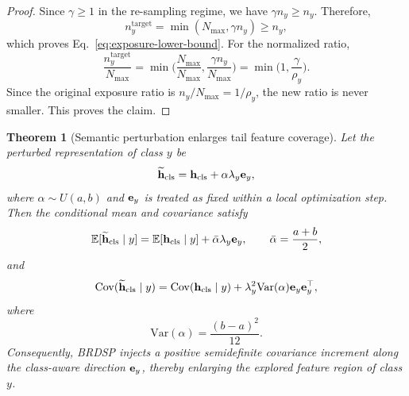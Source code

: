 \documentclass[journal]{IEEEtran}
\theoremstyle{plain}
\newtheorem{theorem}{Theorem}[section]
\theoremstyle{definition}
\theoremstyle{remark}
\begin{document}
\begin{proof}
Since $\gamma\ge 1$ in the re-sampling regime, we have $\gamma n_y\ge n_y$. Therefore,
\begin{equation}
n_y^{\mathrm{target}}=\min(N_{\max},\gamma n_y)\ge n_y,
\end{equation}
which proves Eq.~\eqref{eq:exposure-lower-bound}. For the normalized ratio,
\begin{equation}
\frac{n_y^{\mathrm{target}}}{N_{\max}}
=\min\Big(\frac{N_{\max}}{N_{\max}},\frac{\gamma n_y}{N_{\max}}\Big)
=\min\Big(1,\frac{\gamma}{\rho_y}\Big).
\end{equation}
Since the original exposure ratio is $n_y/N_{\max}=1/\rho_y$, the new ratio is never smaller. This proves the claim.
\end{proof}

\begin{theorem}[Semantic perturbation enlarges tail feature coverage]
\label{thm:covariance-expansion}
Let the perturbed representation of class $y$ be
\begin{equation}
\widetilde{\bf h}_{\mathrm{cls}} = {\bf h}_{\mathrm{cls}} + \alpha \lambda_y {\bf e}_y,
\label{eq:perturbed-feature-theory}
\end{equation}
where $\alpha\sim U(a,b)$ and ${\bf e}_y$ is treated as fixed within a local optimization step. Then the conditional mean and covariance satisfy
\begin{equation}
\mathbb{E}[\widetilde{\bf h}_{\mathrm{cls}}\mid y]
=
\mathbb{E}[{\bf h}_{\mathrm{cls}}\mid y]
+
\bar{\alpha}\lambda_y {\bf e}_y,
\qquad
\bar{\alpha}=\frac{a+b}{2},
\label{eq:perturbed-mean}
\end{equation}
and
\begin{equation}
\mathrm{Cov}(\widetilde{\bf h}_{\mathrm{cls}}\mid y)
=
\mathrm{Cov}({\bf h}_{\mathrm{cls}}\mid y)
+
\lambda_y^2\mathrm{Var}(\alpha){\bf e}_y{\bf e}_y^\top,
\label{eq:perturbed-cov}
\end{equation}
where
\begin{equation}
\mathrm{Var}(\alpha)=\frac{(b-a)^2}{12}.
\end{equation}
Consequently, BRDSP injects a positive semidefinite covariance increment along the class-aware direction ${\bf e}_y$, thereby enlarging the explored feature region of class $y$.
\end{theorem}
\end{document}
